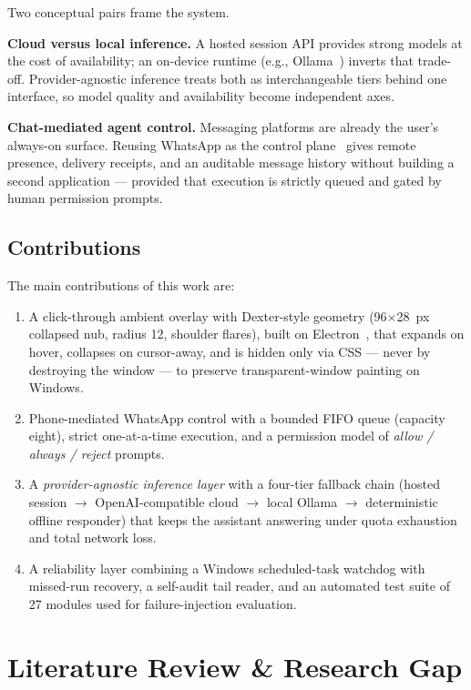 \documentclass[conference]{IEEEtran}
\begin{document}
Two conceptual pairs frame the system.

\textbf{Cloud versus local inference.} A hosted session API
provides strong models at the cost of availability; an on-device
runtime (e.g., Ollama~\cite{ollama}) inverts that trade-off.
Provider-agnostic inference treats both as interchangeable tiers
behind one interface, so model quality and availability become
independent axes.

\textbf{Chat-mediated agent control.} Messaging platforms are
already the user's always-on surface. Reusing WhatsApp as the
control plane~\cite{whatsapp} gives remote presence, delivery
receipts, and an auditable message history without building a
second application --- provided that execution is strictly queued
and gated by human permission prompts.

\subsection{Contributions}

The main contributions of this work are:

\begin{enumerate}
  \item A click-through ambient overlay with Dexter-style
  geometry (96$\times$28~px collapsed nub, radius 12, shoulder
  flares), built on Electron~\cite{elect}, that expands on hover, collapses on cursor-away, and is
  hidden only via CSS --- never by destroying the window --- to
  preserve transparent-window painting on Windows.
  \item Phone-mediated WhatsApp control with a bounded FIFO queue
  (capacity eight), strict one-at-a-time execution, and a
  permission model of \emph{allow / always / reject} prompts.
  \item A \emph{provider-agnostic inference layer} with a
  four-tier fallback chain (hosted session $\rightarrow$
  OpenAI-compatible cloud $\rightarrow$ local Ollama
  $\rightarrow$ deterministic offline responder) that keeps the
  assistant answering under quota exhaustion and total network
  loss.
  \item A reliability layer combining a Windows scheduled-task
  watchdog with missed-run recovery, a self-audit tail reader,
  and an automated test suite of 27 modules used for
  failure-injection evaluation.
\end{enumerate}

\section{Literature Review \& Research Gap}
\end{document}
